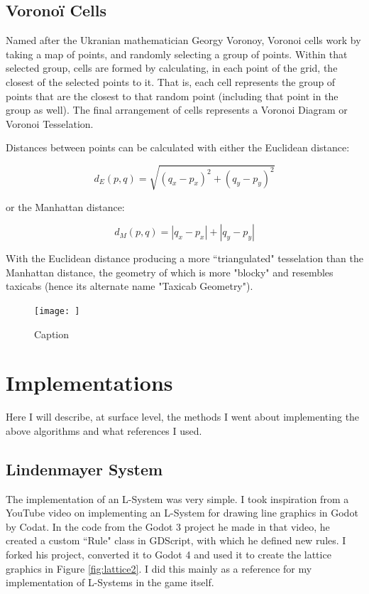 \subsection{Voronoï Cells}

Named after the Ukranian mathematician Georgy Voronoy, Voronoi cells work by taking a map of points, and randomly selecting a group of points. Within that selected group, cells are formed by calculating, in each point of the grid, the closest of the selected points to it. That is, each cell represents the group of points that are the closest to that random point (including that point in the group as well). The final arrangement of cells represents a Voronoi Diagram or Voronoi Tesselation.

Distances between points can be calculated with either the Euclidean distance:

$$ d_{E}(p, q) = \sqrt{(q_x - p_x)^2 + (q_y - p_y)^2} $$

or the Manhattan distance:

$$ d_{M}(p, q) = |q_x - p_x| + |q_y - p_y| $$

With the Euclidean distance producing a more ``triangulated" tesselation than the Manhattan distance, the geometry of which is more "blocky" and resembles taxicabs (hence its alternate name "Taxicab Geometry").

\begin{figure}[H]
    \centering
    \texttt{[image: ]}
    \caption{Caption}
    \label{fig:my_label}
\end{figure}

\section{Implementations}

Here I will describe, at surface level, the methods I went about implementing the above algorithms and what references I used.

\subsection{Lindenmayer System}

The implementation of an L-System was very simple. I took inspiration from a YouTube video on implementing an L-System for drawing line graphics in Godot by Codat.\cite{codatGD3LSystemYT} In the code from the Godot 3 project he made in that video\cite{codatGD3LSystemGH}\cite{codatGD3LSystemYT}, he created a custom ``Rule" class in GDScript, with which he defined new rules. I forked his project, converted it to Godot 4 and used it to create the lattice graphics in Figure \ref{fig:lattice2}. I did this mainly as a reference for my implementation of L-Systems in the game itself.

